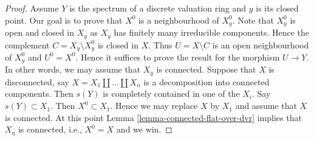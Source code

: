 \begin{proof}
\medskip\noindent
Assume $Y$ is the spectrum of a discrete valuation ring and $y$ is its closed
point. Our goal is to prove that $X^0$ is a neighbourhood of $X^0_y$.
Note that $X^0_y$ is open and closed in $X_y$ as $X_y$ has finitely
many irreducible components. Hence the complement $C = X_y \setminus X_y^0$
is closed in $X$. Thus $U = X \setminus C$ is an open neighbourhood of
$X^0_y$ and $U^0 = X^0$. Hence it suffices to prove the result for the
morphism $U \to Y$. In other words, we may assume that
$X_y$ is connected. Suppose that $X$ is disconnected, say
$X = X_1 \amalg \ldots \amalg X_n$ is a decomposition into connected
components. Then $s(Y)$ is completely contained in one of the $X_i$.
Say $s(Y) \subset X_1$. Then $X^0 \subset X_1$. Hence we may replace
$X$ by $X_1$ and assume that $X$ is connected. At this point
Lemma \ref{lemma-connected-flat-over-dvr}
implies that $X_\eta$ is connected, i.e., $X^0 = X$ and we win.
\end{proof}